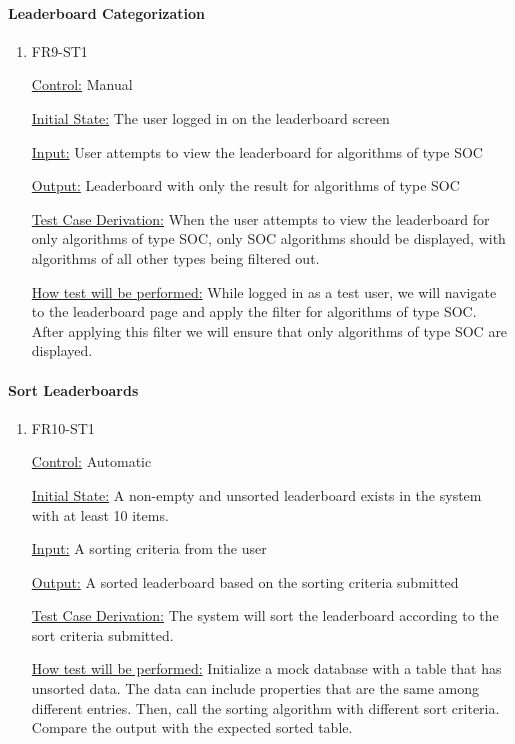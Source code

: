\documentclass[12pt, titlepage]{article}
\begin{document}
\paragraph{Leaderboard Categorization}

\begin{enumerate}

\item{FR9-ST1\\}

\underline{Control:} Manual

\underline{Initial State:} The user logged in on the leaderboard screen

\underline{Input:} User attempts to view the leaderboard for algorithms of type SOC

\underline{Output:} Leaderboard with only the result for algorithms of type SOC

\underline{Test Case Derivation:} When the user attempts to view the leaderboard for only algorithms of type SOC, only SOC algorithms should be displayed, with algorithms of all other types being filtered out.

\underline{How test will be performed:} While logged in as a test user, we will navigate to the leaderboard page and apply the filter for algorithms of type SOC. After applying this filter we will ensure that only algorithms of type SOC are displayed.

\end{enumerate}

\paragraph{Sort Leaderboards}

\begin{enumerate}

\item{FR10-ST1\\}

\underline{Control:} Automatic

\underline{Initial State:} A non-empty and unsorted leaderboard exists in the system with at least 10 items.

\underline{Input:} A sorting criteria from the user

\underline{Output:} A sorted leaderboard based on the sorting criteria submitted

\underline{Test Case Derivation:} The system will sort the leaderboard according to the sort criteria submitted.

\underline{How test will be performed:} Initialize a mock database with a table that has unsorted data. The data can include properties that are the same among different entries. Then, call the sorting algorithm with different sort criteria. Compare the output with the expected sorted table.

\end{enumerate}
\end{document}

